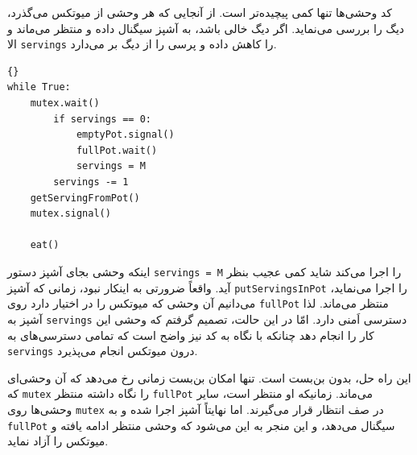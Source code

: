 \documentclass{book}
\begin{document}
    کد وحشی‌ها تنها کمی پیچیده‌تر است. از آنجایی که هر وحشی از میوتکس می‌گذرد، دیگ را بررسی می‌نماید. 
    اگر دیگ خالی باشد، به آشپز سیگنال داده و منتظر می‌ماند و الا  {\tt servings} را کاهش داده و پرسی را از دیگ بر می‌دارد. 

\begin{latin}
\begin{lstlisting}[title=\rl{راه‌ حل غذاخوردن وحشی‌ها (وحشی)}]{}
while True:
    mutex.wait()
        if servings == 0:
            emptyPot.signal()
            fullPot.wait()
            servings = M
        servings -= 1
	getServingFromPot()
    mutex.signal()

    eat()
\end{lstlisting}
\end{latin}

    اینکه وحشی بجای آشپز دستور {\tt servings = M} را اجرا می‌کند شاید کمی عجیب بنظر آید. واقعاً ضرورتی به اینکار نبود، زمانی که 
    آشپز {\tt putServingsInPot} را اجرا می‌نماید، می‌دانیم آن وحشی که میوتکس را در اختیار دارد روی {\tt fullPot} منتظر می‌ماند. 
    لذا آشپز به  {\tt servings} دسترسی اَمنی دارد.  امّا در این حالت،‌ تصمیم گرفتم که وحشی این کار را انجام دهد چنانکه با نگاه به کد نیز 
    واضح است که تمامی دسترسی‌های به  {\tt servings} درون میوتکس انجام می‌پذیرد. 
    

    این راه حل، بدون بن‌بست است. تنها امکان بن‌بست زمانی رخ می‌دهد که آن وحشی‌ای که {\tt mutex}  را نگاه داشته منتظر {\tt fullPot} می‌ماند. 
    زمانیکه او منتظر است، سایر وحشی‌ها روی {\tt mutex} در صف انتظار قرار می‌گیرند. اما نهایتاً آشپز اجرا شده و به {\tt fullPot} سیگنال می‌دهد، 
    و این منجر به این می‌شود که  وحشی منتظر ادامه یافته و میوتکس را آزاد نماید. 
    
\end{document}
